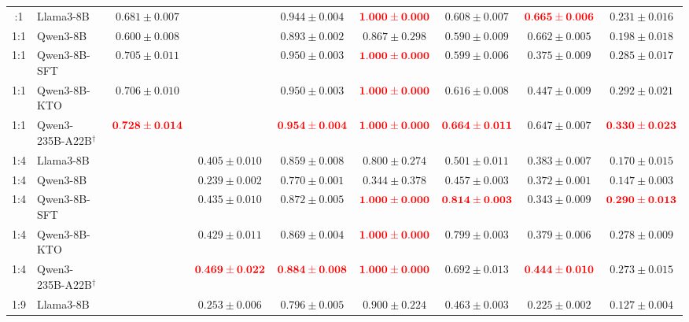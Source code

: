 \documentclass[pdflatex,sn-mathphys-num]{sn-jnl}
\begin{document}
\begin{landscape}
\begin{longtable}{clccccccc}
\bottomrule
\endlastfoot
1:1 & Llama3-8B & \(0.681 \pm 0.007\) &  & \(0.944 \pm 0.004\) & \(\textcolor{red}{\mathbf{1.000 \pm 0.000}}\) & \(0.608 \pm 0.007\) & \(\textcolor{red}{\mathbf{0.665 \pm 0.006}}\) & \(0.231 \pm 0.016\) \\
1:1 & Qwen3-8B & \(0.600 \pm 0.008\) &  & \(0.893 \pm 0.002\) & \(\mathbf{0.867 \pm 0.298}\) & \(0.590 \pm 0.009\) & \(\mathbf{0.662 \pm 0.005}\) & \(0.198 \pm 0.018\) \\
1:1 & Qwen3-8B-SFT & \(0.705 \pm 0.011\) &  & \(0.950 \pm 0.003\) & \(\textcolor{red}{\mathbf{1.000 \pm 0.000}}\) & \(0.599 \pm 0.006\) & \(0.375 \pm 0.009\) & \(0.285 \pm 0.017\) \\
1:1 & Qwen3-8B-KTO & \(\mathbf{0.706 \pm 0.010}\) &  & \(\mathbf{0.950 \pm 0.003}\) & \(\textcolor{red}{\mathbf{1.000 \pm 0.000}}\) & \(\mathbf{0.616 \pm 0.008}\) & \(0.447 \pm 0.009\) & \(\mathbf{0.292 \pm 0.021}\) \\
1:1 & Qwen3-235B-A22B$^{\dagger}$ & \(\textcolor{red}{\mathbf{0.728 \pm 0.014}}\) &  & \(\textcolor{red}{\mathbf{0.954 \pm 0.004}}\) & \(\textcolor{red}{\mathbf{1.000 \pm 0.000}}\) & \(\textcolor{red}{\mathbf{0.664 \pm 0.011}}\) & \(0.647 \pm 0.007\) & \(\textcolor{red}{\mathbf{0.330 \pm 0.023}}\) \\
\midrule
1:4 & Llama3-8B &  & \(0.405 \pm 0.010\) & \(0.859 \pm 0.008\) & \(\mathbf{0.800 \pm 0.274}\) & \(0.501 \pm 0.011\) & \(\mathbf{0.383 \pm 0.007}\) & \(0.170 \pm 0.015\) \\
1:4 & Qwen3-8B &  & \(0.239 \pm 0.002\) & \(0.770 \pm 0.001\) & \(0.344 \pm 0.378\) & \(0.457 \pm 0.003\) & \(0.372 \pm 0.001\) & \(0.147 \pm 0.003\) \\
1:4 & Qwen3-8B-SFT &  & \(\mathbf{0.435 \pm 0.010}\) & \(\mathbf{0.872 \pm 0.005}\) & \(\textcolor{red}{\mathbf{1.000 \pm 0.000}}\) & \(\textcolor{red}{\mathbf{0.814 \pm 0.003}}\) & \(0.343 \pm 0.009\) & \(\textcolor{red}{\mathbf{0.290 \pm 0.013}}\) \\
1:4 & Qwen3-8B-KTO &  & \(0.429 \pm 0.011\) & \(0.869 \pm 0.004\) & \(\textcolor{red}{\mathbf{1.000 \pm 0.000}}\) & \(\mathbf{0.799 \pm 0.003}\) & \(0.379 \pm 0.006\) & \(\mathbf{0.278 \pm 0.009}\) \\
1:4 & Qwen3-235B-A22B$^{\dagger}$ &  & \(\textcolor{red}{\mathbf{0.469 \pm 0.022}}\) & \(\textcolor{red}{\mathbf{0.884 \pm 0.008}}\) & \(\textcolor{red}{\mathbf{1.000 \pm 0.000}}\) & \(0.692 \pm 0.013\) & \(\textcolor{red}{\mathbf{0.444 \pm 0.010}}\) & \(0.273 \pm 0.015\) \\
\midrule
1:9 & Llama3-8B &  & \(0.253 \pm 0.006\) & \(0.796 \pm 0.005\) & \(\mathbf{0.900 \pm 0.224}\) & \(0.463 \pm 0.003\) & \(0.225 \pm 0.002\) & \(0.127 \pm 0.004\) \\

\end{longtable}
\end{landscape}
\end{document}
